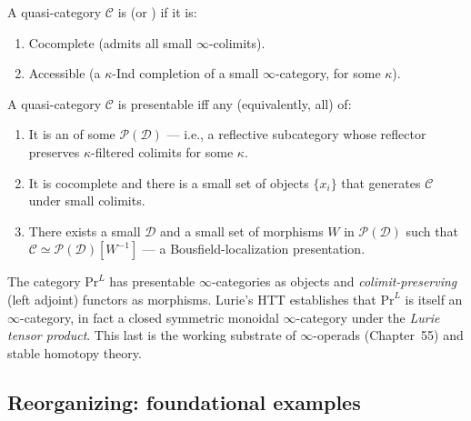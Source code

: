 \begin{definition}
\label{def:presentable}
A quasi-category $\mathcal{C}$ is  (or ) if it is:
\begin{enumerate}
  \item Cocomplete (admits all small $\infty$-colimits).
  \item Accessible (a $\kappa$-Ind completion of a small $\infty$-category, for some $\kappa$).
\end{enumerate}
\end{definition}

\begin{theorem}
\label{thm:presentable-characterizations}
A quasi-category $\mathcal{C}$ is presentable iff any (equivalently, all) of:
\begin{enumerate}
  \item It is an  of some
        $\mathcal{P}(\mathcal{D})$ — i.e., a reflective subcategory
        whose reflector preserves $\kappa$-filtered colimits for some
        $\kappa$.
  \item It is cocomplete and there is a small set of objects
        $\{x_i\}$ that generates $\mathcal{C}$ under small colimits.
  \item There exists a small $\mathcal{D}$ and a small set of morphisms
        $W$ in $\mathcal{P}(\mathcal{D})$ such that $\mathcal{C} \simeq
        \mathcal{P}(\mathcal{D})[W^{-1}]$ — a Bousfield-localization
        presentation.
\end{enumerate}
\end{theorem}

\begin{remark}
The category $\mathrm{Pr}^L$ has presentable $\infty$-categories as
objects and \emph{colimit-preserving} (left adjoint) functors as
morphisms. Lurie's HTT establishes that $\mathrm{Pr}^L$ is itself an
$\infty$-category, in fact a closed symmetric monoidal $\infty$-category
under the \emph{Lurie tensor product}. This last is the working substrate
of $\infty$-operads (Chapter~55) and stable homotopy theory.
\end{remark}

\subsection{Reorganizing: foundational examples}

